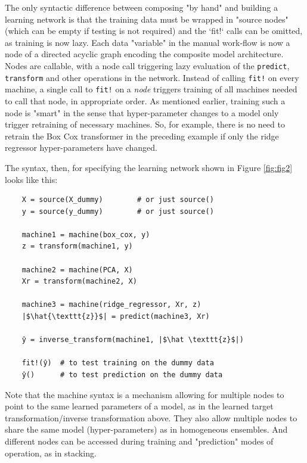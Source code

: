 \documentclass{article}
\begin{document}
The only syntactic difference between composing "by hand" and building
a learning network is that the training data must be wrapped in
"source nodes" (which can be empty if testing is not required) and the
`fit!` calls can be omitted, as training is now lazy. Each data
"variable" in the manual work-flow is now a node of a directed acyclic
graph encoding the composite model architecture. Nodes are callable,
with a node call triggering lazy evaluation of the \texttt{predict},
\texttt{transform} and other operations in the network. Instead of
calling \texttt{fit!} on every machine, a single call to \texttt{fit!}
on a \textit{node} triggers training of all machines needed to call
that node, in appropriate order. As mentioned earlier, training such a
node is "smart" in the sense that hyper-parameter changes to a model
only trigger retraining of necessary machines. So, for example, there
is no need to retrain the Box Cox transformer in the preceding example
if only the ridge regressor hyper-parameters have changed.

The syntax, then, for specifying the learning network shown in Figure
\ref{fig:fig2} looks like this:

\begin{verbatim}
    X = source(X_dummy)        # or just source()
    y = source(y_dummy)        # or just source()

    machine1 = machine(box_cox, y)
    z = transform(machine1, y)

    machine2 = machine(PCA, X)
    Xr = transform(machine2, X)

    machine3 = machine(ridge_regressor, Xr, z)
    |$\hat{\texttt{z}}$| = predict(machine3, Xr)

    ŷ = inverse_transform(machine1, |$\hat \texttt{z}$|)

    fit!(ŷ)  # to test training on the dummy data
    ŷ()      # to test prediction on the dummy data
\end{verbatim}


Note that the machine syntax is a mechanism allowing for multiple
nodes to point to the same learned parameters of a model, as in the
learned target transformation/inverse transformation above. They also
allow multiple nodes to share the same model (hyper-parameters) as in
homogeneous ensembles. And different nodes can be accessed during
training and "prediction" modes of operation, as in stacking.
\end{document}
